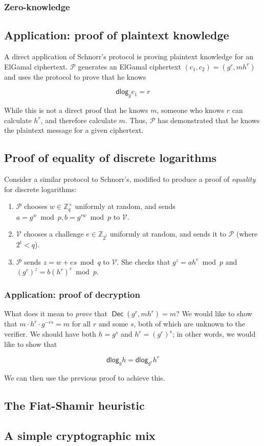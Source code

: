 \documentclass[11pt,twoside,a4paper]{article}
\DeclareMathOperator{\Dec}{\mathsf{Dec}}
\newcommand{\dlog}{\mathsf{dlog}}
\theoremstyle{definition}
\begin{document}
\subsubsection{Zero-knowledge}
\subsection{Application: proof of plaintext knowledge}
A direct application of Schnorr's protocol is proving plaintext knowledge for an ElGamal ciphertext. \(\mathcal{P}\) generates an ElGamal ciphertext \((c_1, c_2)=(g^r, mh^r)\) and uses the protocol to prove that he knows

\[\dlog_g{c_1}=r\]

While this is not a direct proof that he knows \(m\), someone who knows \(r\) can calculate \(h^r\), and therefore calculate \(m\). Thus, \(\mathcal{P}\) has demonstrated that he knows the plaintext message for a given ciphertext.

\subsection{Proof of equality of discrete logarithms}
Consider a similar protocol to Schnorr's, modified to produce a proof of \textit{equality} for discrete logarithms:
\begin{enumerate}
    \item \(\mathcal{P}\) chooses \(w\in\mathbb{Z}^\times_q\) uniformly at random, and sends \(a=g^w\bmod p,b=g^{rw}\bmod p\) to \(\mathcal{V}\).
    \item \(\mathcal{V}\) chooses a challenge \(e\in\mathbb{Z}_{2^t}\) uniformly at random, and sends it to \(\mathcal{P}\) (where \(2^t<q\)).
    \item \(\mathcal{P}\) sends \(z=w+es\bmod q\) to \(\mathcal{V}\). She checks that \(g^z=ah^e\bmod p\) and \((g^r)^z=b(h^r)^e\bmod p\).
\end{enumerate}

\subsubsection{Application: proof of decryption}
What does it mean to \textit{prove} that \(\Dec(g^r,mh^r)=m\)? We would like to show that \(m\cdot h^r\cdot g^{-rs}=m\) for all \(r\) and some \(s\), both of which are unknown to the verifier. We should have both \(h=g^s\) and \(h^r=(g^r)^s\); in other words, we would like to show that

\[\dlog_g{h}=\dlog_{g^r}{h^r}\]

We can then use the previous proof to achieve this.
\subsection{The Fiat-Shamir heuristic}
\subsection{A simple cryptographic mix}
\end{document}

